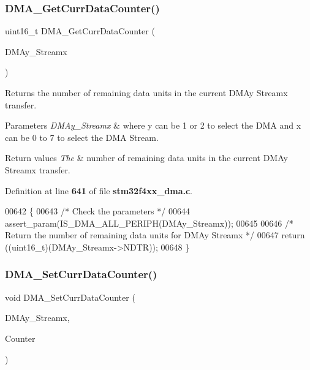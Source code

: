 \subsubsection{D\+M\+A\+\_\+\+Get\+Curr\+Data\+Counter()}
{\footnotesize\ttfamily uint16\+\_\+t D\+M\+A\+\_\+\+Get\+Curr\+Data\+Counter (\begin{DoxyParamCaption}\item[{\textbf{ D\+M\+A\+\_\+\+Stream\+\_\+\+Type\+Def} $\ast$}]{D\+M\+Ay\+\_\+\+Streamx }\end{DoxyParamCaption})}



Returns the number of remaining data units in the current D\+M\+Ay Streamx transfer. 


\begin{DoxyParams}{Parameters}
{\em D\+M\+Ay\+\_\+\+Streamx} & where y can be 1 or 2 to select the D\+MA and x can be 0 to 7 to select the D\+MA Stream. \\
\hline
\end{DoxyParams}

\begin{DoxyRetVals}{Return values}
{\em The} & number of remaining data units in the current D\+M\+Ay Streamx transfer. \\
\hline
\end{DoxyRetVals}


Definition at line \textbf{ 641} of file \textbf{ stm32f4xx\+\_\+dma.\+c}.


\begin{DoxyCode}
00642 \{
00643   \textcolor{comment}{/* Check the parameters */}
00644   assert_param(IS_DMA_ALL_PERIPH(DMAy\_Streamx));
00645 
00646   \textcolor{comment}{/* Return the number of remaining data units for DMAy Streamx */}
00647   \textcolor{keywordflow}{return} ((uint16\_t)(DMAy\_Streamx->NDTR));
00648 \}
\end{DoxyCode}
\mbox{\label{group__DMA__Group2_ga6a11a2c951cff59b125ba8857d44e3f3}} 
\subsubsection{D\+M\+A\+\_\+\+Set\+Curr\+Data\+Counter()}
{\footnotesize\ttfamily void D\+M\+A\+\_\+\+Set\+Curr\+Data\+Counter (\begin{DoxyParamCaption}\item[{\textbf{ D\+M\+A\+\_\+\+Stream\+\_\+\+Type\+Def} $\ast$}]{D\+M\+Ay\+\_\+\+Streamx,  }\item[{uint16\+\_\+t}]{Counter }\end{DoxyParamCaption})}



